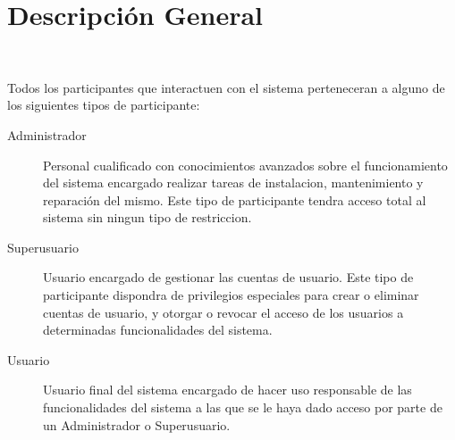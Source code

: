 \section{Descripción General}

\

    Todos los participantes que interactuen con el sistema perteneceran a alguno de los siguientes tipos de participante:

    \begin{description}
        \item[Administrador] Personal cualificado con conocimientos avanzados sobre el funcionamiento del sistema encargado realizar tareas de instalacion, mantenimiento y reparación del mismo. Este tipo de participante tendra acceso total al sistema sin ningun tipo de restriccion.

        \item[Superusuario] Usuario encargado de gestionar las cuentas de usuario. Este tipo de participante dispondra de privilegios especiales para crear o eliminar cuentas de usuario, y otorgar o revocar el acceso de los usuarios a determinadas funcionalidades del sistema.

        \item[Usuario] Usuario final del sistema encargado de hacer uso responsable de las funcionalidades del sistema a las que se le haya dado acceso por parte de un Administrador o Superusuario.
    \end{description}
